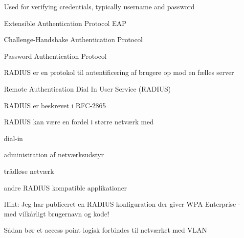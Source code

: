 \documentclass[Screen16to9,17pt]{foils}
\begin{document}

\begin{list2}
\item Used for verifying credentials, typically username and password
\item
Extensible Authentication Protocol EAP\\
 \item Challenge-Handshake Authentication Protocol\\
 \item Password Authentication Protocol\\
\end{list2}


\begin{list1}
\item RADIUS er en protokol til autentificering af brugere op mod en
  fælles server
\item Remote Authentication Dial In User Service (RADIUS)
\item RADIUS er beskrevet i RFC-2865
\item RADIUS kan være en fordel i større netværk med
\begin{list2}
\item dial-in
\item administration af netværksudstyr
\item trådløse netværk
\item andre RADIUS kompatible applikationer
\end{list2}
\item {}
\end{list1}

Hint: Jeg har publiceret en RADIUS konfiguration der giver WPA Enterprise - med vilkårligt brugernavn og kode!\\




\centerline{\hlkbig Sådan bør et access point logisk forbindes til netværket med VLAN}
\end{document}
